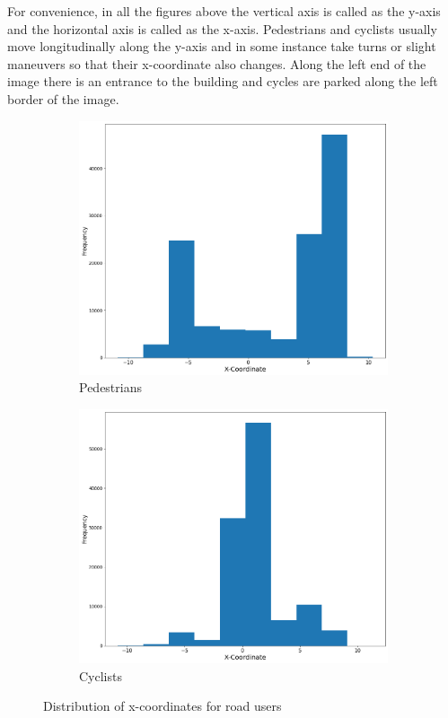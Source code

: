 \documentclass{article}
\begin{document}
For convenience, in all the figures above the vertical axis is called as the y-axis and the horizontal axis is called as the x-axis. Pedestrians and cyclists usually move longitudinally along the y-axis and in some instance take turns or slight maneuvers so that their x-coordinate also changes. Along the left end of the image there is an entrance to the building and cycles are parked along the left border of the image. 

\begin{figure}[H]
\centering
\begin{subfigure}{0.5\textwidth}
  \centering
  \includegraphics[width=\linewidth]{quali_results/hist-ped.png}
  \caption{Pedestrians}
  \label{fig:cyc-1-1}
\end{subfigure}%
\begin{subfigure}{0.5\textwidth}
  \centering
  \includegraphics[width=\linewidth]{quali_results/hist-cycle.png}
  \caption{Cyclists}
  \label{fig:cyc-1-2}
\end{subfigure}
\caption{Distribution of x-coordinates for road users}
\label{fig:cyc-1}
\end{figure}
\end{document}
